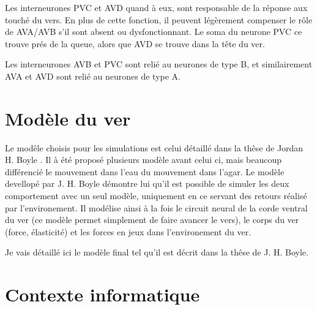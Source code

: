 Les interneurones PVC et AVD quand à eux, sont responsable de la réponse aux
touché du vers. En plus de cette fonction, il peuvent légèrement compenser le
rôle de AVA/AVB s'il sont absent ou dysfonctionnant. Le soma du neurone PVC ce
trouve prés de la queue, alors que AVD se trouve dans la tête du ver.

Les interneurones AVB et PVC sont relié au neurones de type B, et similairement
AVA et AVD sont relié au neurones de type A.




\section{Modèle du ver} %
\label{sec:Modèle du ver}

Le modêle choisis pour les simulations est celui détaillé dans la thêse de
Jordan H. Boyle \cite{Boyle2009}. Il à été proposé plusieurs modèle avant
celui ci, mais beaucoup différencié le mouvement dans l'eau du mouvement
dans l'agar. Le modèle devellopé par J. H. Boyle démontre lui qu'il est
possible de simuler les deux comportement avec un seul modèle, uniquement
en ce servant des retours réalisé par l'environement. Il modélise ainsi à la
fois le circuit neural de la corde ventral du ver (ce modèle permet simplement
de faire avancer le vers), le corps du ver (force, élasticité) et les forces
en jeux dans l'environement du ver.

Je vais détaillé ici le modèle final tel qu'il est décrit dans la thêse de J. H. Boyle.


\section{Contexte informatique} %
\label{sec:Contexte informatique}


